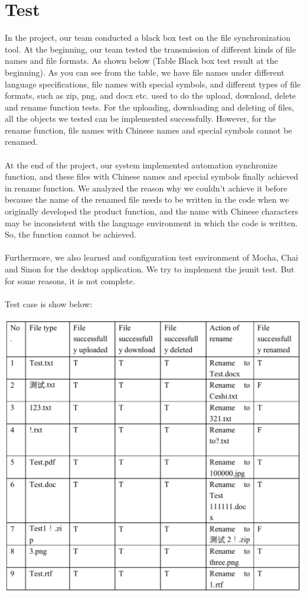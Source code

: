 \section{Test}

In the project, our team conducted a black box test on the file synchronization tool. At the beginning, our team tested the transmission of different kinds of file names and file formats. As shown below (Table Black box test result at the beginning). As you can see from the table, we have file names under different language specifications, file names with special symbols, and different types of file formats, such as zip, png, and docx etc. used to do the upload, download, delete and rename function tests. For the uploading, downloading and deleting of files, all the objects we tested can be implemented successfully. However, for the rename function, file names with Chinese names and special symbols cannot be renamed. \\\\
At the end of the project, our system implemented automation synchronize function, and these files with Chinese names and special symbols finally achieved in rename function. We analyzed the reason why we couldn't achieve it before because the name of the renamed file needs to be written in the code when we originally developed the product function, and the name with Chinese characters may be inconsistent with the language environment in which the code is written. So, the function cannot be achieved.\\\\
Furthermore, we also learned and configuration test environment of Mocha, Chai and Sinon for the desktop application. We try to implement the jsunit test. But for some reasons, it is not complete.\\\\
Test case is show below:\\
\begin{minipage}
\centering
\includegraphics[scale=0.5]{test_case.png}

\label{fig:test_case}
\end{minipage}
